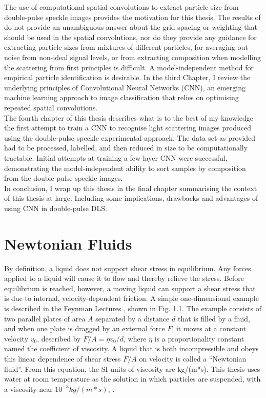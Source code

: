 The use of computational spatial convolutions to extract particle size from double-pulse speckle images provides the motivation for this thesis. The results of \cite{LeeS} do not provide an unambiguous answer about the grid spacing or weighting that should be used in the spatial convolutions, nor do they provide any guidance for extracting particle sizes from mixtures of different particles, for averaging out noise from non-ideal signal levels, or from extracting composition when modelling the scattering from first principles is difficult. A model-independent method for empirical particle identification is desirable. In the third Chapter, I review the underlying principles of Convolutional Neural Networks (CNN), an emerging machine learning approach to image classification that relies on optimising repeated spatial convolutions. \\

The fourth chapter of this thesis describes what is to the best of my knowledge the first attempt to train a CNN to recognise light scattering images produced using the double-pulse speckle experimental approach. The data set as provided had to be processed, labelled, and then reduced in size to be computationally tractable. Initial attempts at training a few-layer CNN were successful, demonstrating the model-independent ability to sort samples by composition from the double-pulse speckle images.\\

In conclusion, I wrap up this thesis in the final chapter summarising the context of this thesis at large. Including some implications, drawbacks and advantages of using CNN in double-pulse DLS. \\

\section{Newtonian Fluids}

By definition, a liquid does not support shear stress in equilibrium. Any forces applied to a liquid will cause it to flow and thereby relieve the stress. Before equilibrium is reached, however, a moving liquid can support a shear stress that is due to internal, velocity-dependent friction.  A simple one-dimensional example is described in the Feynman Lectures \citep{Feynman}, shown in Fig. 1.1.  The example consists of two parallel plates of area $A$ separated by a distance $d$ that is filled by a fluid, and when one plate is dragged by an external force $F$, it moves at a constant velocity $v_0$, described by $F/A = \eta v_0/d$, where $\eta$ is a proportionality constant named the coefficient of viscosity. A liquid that is both incompressible and obeys this linear dependence of shear stress $F/A$ on velocity is called a ``Newtonian fluid”. From this equation, the SI units of viscosity are kg/(m*s). This thesis uses water at room temperature as the solution in which particles are suspended, with a viscosity near $10^{-3} kg/(m*s)$, \citep{Feynman}. \\


